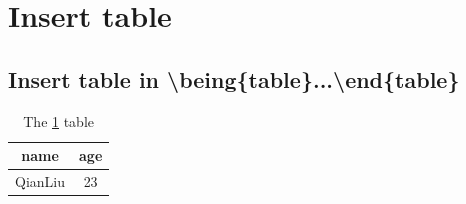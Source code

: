 \documentclass{article}
\begin{document}
    \section{Insert table}
        \subsection{Insert table in \textbackslash being\{table\}...\textbackslash end\{table\}}
        \begin{table}[htbp]
            \centering
            \caption{The \ref{tab_1} table}
            \begin{tabular}{|c|c|}
                \hline
                name & age \\
                \hline\hline
                QianLiu & 23 \\
                \hline
            \end{tabular}
            \label{tab_1}%
        \end{table}
\end{document}
